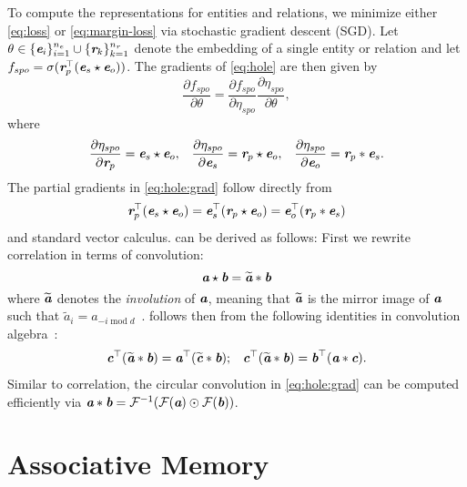 \documentclass[letterpaper]{article}
\renewcommand{\vec}[1]{\textit{\textbf{#1}}}
\newcommand{\ve}{\vec{e}}
\newcommand{\vr}{\vec{r}}
\newcommand{\vc}{\vec{c}}
\newcommand{\va}{\vec{a}}
\newcommand{\vb}{\vec{b}}
\newcommand{\cconv}{\ast}
\newcommand{\ccorr}{\star}
\newcommand{\invl}[1]{\widetilde{#1}}
\newcommand{\hadamard}{\odot}
\newcommand{\transp}{\top}
\newcommand{\fft}{\mathcal{F}}
\newcommand{\ifft}{\mathcal{F}^{-1}}
\begin{document}
\noindent
To compute the representations for entities and relations, we minimize either
\cref{eq:loss} or \eqref{eq:margin-loss} via stochastic gradient descent (SGD).
Let ${\theta \in \{\ve_i\}_{i=1}^{n_e} \cup \{\vr_k\}_{k=1}^{n_r}}$ denote the embedding 
of a single entity or relation and let ${f_{spo} = \sigma(\vr_p^\transp(\ve_s \ccorr
  \ve_o))}$. 
The gradients of \cref{eq:hole} are then given by
\begin{equation*}
  \frac{\partial f_{spo}}{\partial \theta} = \frac{\partial f_{spo}}{\partial
    \eta_{spo}} \frac{\partial \eta_{spo}}{\partial \theta},
\end{equation*}
where
\begin{align}
  \label{eq:hole:grad}
  \frac{\partial \eta_{spo}}{\partial \vr_p} = \ve_s \ccorr \ve_o, 
  &&
  \frac{\partial \eta_{spo}}{\partial \ve_s} = \vr_p \ccorr \ve_o, 
  &&
  \frac{\partial \eta_{spo}}{\partial \ve_o} = \vr_p \cconv \ve_s .
\end{align}
The partial gradients in \cref{eq:hole:grad} follow directly from
\begin{align}
  \label{eq:omni}
  \vr_p^\transp (\ve_s \ccorr \ve_o) = \ve_s^\transp(\vr_p \ccorr \ve_o) = \ve_o^\transp(\vr_p \cconv \ve_s)
\end{align}
and standard vector calculus. 
 can be derived as follows:
First we rewrite correlation in terms of convolution:
\begin{equation*}
  \label{eq:corr-conv}
  \va \ccorr \vb = \invl{\va} \cconv \vb
\end{equation*}
where $\invl{\va}$ denotes the \emph{involution} of $\va$, meaning that
$\invl{\va}$ is the mirror image of $\va$ such that $\invl{a}_i =
a_{-i \operatorname{mod} d}$~\citep[eq. 2.4]{schonemann1987some}.
 follows then from the following identities in convolution algebra~\citep{plate1995holographic}:
\begin{align*}
  \label{eq:corr-id}
  \vc^\transp(\invl{\va} \cconv \vb) = \va^\transp (\invl{\vc} \cconv \vb); 
  &&
  \vc^\transp(\invl{\va} \cconv \vb) = \vb^\transp (\va \cconv \vc) .
\end{align*}
Similar to correlation, the circular convolution in \cref{eq:hole:grad} can be
computed efficiently via ${\va \cconv \vb = \ifft(\fft(\va)
  \hadamard \fft(\vb))}$.



\section{Associative Memory}
\label{sec:assoc-mem}
\end{document}
